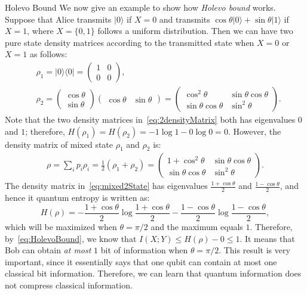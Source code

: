 \begin{subsection}{Holevo Bound}
We now give an example to show how {\it{Holevo bound}} works.
Suppose that Alice transmits $|0\rangle$ if $X=0$ and transmits $\cos \theta |0\rangle + \sin \theta |1\rangle$ if $X=1$, where $X=\{0,1\}$ follows a uniform distribution.
Then we can have two pure state density matrices according to the transmitted state when $X=0$ or $X=1$ as follows:
\begin{align}\label{eq:2densityMatrix}
&\rho_1 = |0\rangle \langle 0| = \begin{pmatrix} 1 &0 \\ 0 &0 \end{pmatrix}, \nonumber \\
&\rho_2 = \begin{pmatrix} \cos \theta \\ \sin \theta \end{pmatrix}
         \begin{pmatrix} \cos \theta & \sin \theta \end{pmatrix} = 
         \begin{pmatrix} \cos^2 \theta &\sin \theta \cos \theta \\
         \sin \theta \cos \theta &\sin^2 \theta \end{pmatrix}.
\end{align}
Note that the two density matrices in~\eqref{eq:2densityMatrix} both has eigenvalues $0$ and $1$; therefore, $H(\rho_1) = H(\rho_2) = -1\log 1 - 0\log 0 = 0$.
However, the density matrix of mixed state $\rho_1$ and $\rho_2$ is:
\begin{align}\label{eq:mixed2State}
\rho = \sum_i p_i \rho_i = \frac{1}{2}(\rho_1 + \rho_2) = 
\begin{pmatrix} 1+\cos^2 \theta &\sin \theta \cos \theta \\
 \sin \theta \cos \theta &\sin^2 \theta \end{pmatrix}.
\end{align}
The density matrix in~\eqref{eq:mixed2State} has eigenvalues $\frac{1+\cos \theta}{2}$ and $\frac{1-\cos \theta}{2}$, and hence it quantum entropy is written as: 
\begin{equation}
H(\rho) = -\frac{1+\cos \theta}{2} \log \frac{1+\cos \theta}{2} - \frac{1-\cos \theta}{2} \log \frac{1-\cos \theta}{2},
\end{equation}
which will be maximized when $\theta = \pi /2$ and the maximum equals $1$.
Therefore, by~\eqref{eq:HolevoBound}, we know that $I(X;Y) \leq H(\rho)-0 \leq 1$.
It means that Bob can obtain \textit{at most} $1$ bit of information when $\theta = \pi /2$.
This result is very important, since it essentially says that one qubit can contain at most one classical bit information.
Therefore, we can learn that quantum information does not compress classical information.
\end{subsection}
